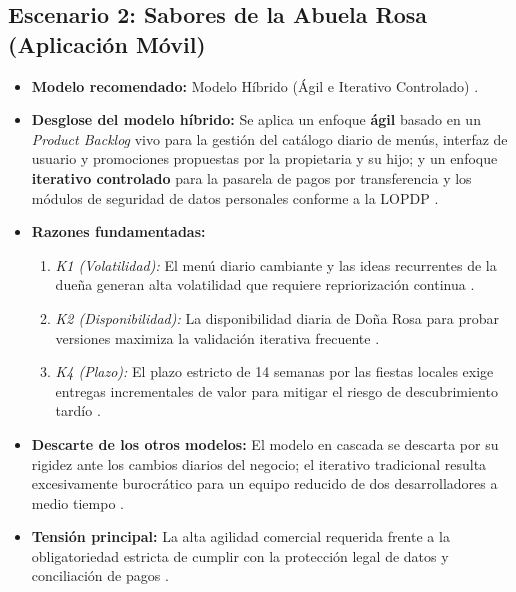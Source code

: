 \documentclass{article}
\begin{document}
\subsection{Escenario 2: Sabores de la Abuela Rosa (Aplicación Móvil)}
\begin{itemize}
    \item \textbf{Modelo recomendado:} Modelo Híbrido (Ágil e Iterativo Controlado) \cite{Inayat2015}.
    \item \textbf{Desglose del modelo híbrido:} Se aplica un enfoque \textbf{ágil} basado en un \emph{Product Backlog} vivo para la gestión del catálogo diario de menús, interfaz de usuario y promociones propuestas por la propietaria y su hijo; y un enfoque \textbf{iterativo controlado} para la pasarela de pagos por transferencia y los módulos de seguridad de datos personales conforme a la LOPDP \cite{GA_Prac_01}.
    \item \textbf{Razones fundamentadas:}
        \begin{enumerate}
            \item \textit{K1 (Volatilidad):} El menú diario cambiante y las ideas recurrentes de la dueña generan alta volatilidad que requiere repriorización continua \cite{GA_Prac_01, Pohl2025}.
            \item \textit{K2 (Disponibilidad):} La disponibilidad diaria de Doña Rosa para probar versiones maximiza la validación iterativa frecuente \cite{GA_Prac_01}.
            \item \textit{K4 (Plazo):} El plazo estricto de 14 semanas por las fiestas locales exige entregas incrementales de valor para mitigar el riesgo de descubrimiento tardío \cite{Sommerville2016}.
        \end{enumerate}
    \item \textbf{Descarte de los otros modelos:} El modelo en cascada se descarta por su rigidez ante los cambios diarios del negocio; el iterativo tradicional resulta excesivamente burocrático para un equipo reducido de dos desarrolladores a medio tiempo \cite{GA_Prac_01}.
    \item \textbf{Tensión principal:} La alta agilidad comercial requerida frente a la obligatoriedad estricta de cumplir con la protección legal de datos y conciliación de pagos \cite{GA_Prac_01}.
\end{itemize}
\end{document}
